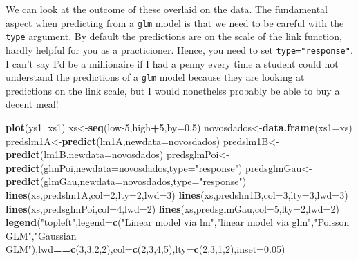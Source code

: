 \documentclass[
]{book}
\newenvironment{Shaded}{\begin{snugshade}}{\end{snugshade}}
\newcommand{\DataTypeTok}[1]{\textcolor[rgb]{0.13,0.29,0.53}{#1}}
\newcommand{\DecValTok}[1]{\textcolor[rgb]{0.00,0.00,0.81}{#1}}
\newcommand{\FloatTok}[1]{\textcolor[rgb]{0.00,0.00,0.81}{#1}}
\newcommand{\KeywordTok}[1]{\textcolor[rgb]{0.13,0.29,0.53}{\textbf{#1}}}
\newcommand{\NormalTok}[1]{#1}
\newcommand{\OperatorTok}[1]{\textcolor[rgb]{0.81,0.36,0.00}{\textbf{#1}}}
\newcommand{\StringTok}[1]{\textcolor[rgb]{0.31,0.60,0.02}{#1}}
\begin{document}
We can look at the outcome of these overlaid on the data. The fundamental aspect when predicting from a \texttt{glm} model is that we need to be careful with the \texttt{type} argument. By default the predictions are on the scale of the link function, hardly helpful for you as a practicioner. Hence, you need to set \texttt{type="response"}. I can't say I'd be a millionaire if I had a penny every time a student could not understand the predictions of a \texttt{glm} model because they are looking at predictions on the link scale, but I would nonethelss probably be able to buy a decent meal!

\begin{Shaded}
\begin{Highlighting}[]
\KeywordTok{plot}\NormalTok{(ys1}\OperatorTok{~}\NormalTok{xs1)}
\NormalTok{xs<-}\KeywordTok{seq}\NormalTok{(low}\DecValTok{-5}\NormalTok{,high}\OperatorTok{+}\DecValTok{5}\NormalTok{,}\DataTypeTok{by=}\FloatTok{0.5}\NormalTok{)}
\NormalTok{novosdados<-}\KeywordTok{data.frame}\NormalTok{(}\DataTypeTok{xs1=}\NormalTok{xs)}
\NormalTok{predslm1A<-}\KeywordTok{predict}\NormalTok{(lm1A,}\DataTypeTok{newdata=}\NormalTok{novosdados)}
\NormalTok{predslm1B<-}\KeywordTok{predict}\NormalTok{(lm1B,}\DataTypeTok{newdata=}\NormalTok{novosdados)}
\NormalTok{predsglmPoi<-}\KeywordTok{predict}\NormalTok{(glmPoi,}\DataTypeTok{newdata=}\NormalTok{novosdados,}\DataTypeTok{type=}\StringTok{"response"}\NormalTok{)}
\NormalTok{predsglmGau<-}\KeywordTok{predict}\NormalTok{(glmGau,}\DataTypeTok{newdata=}\NormalTok{novosdados,}\DataTypeTok{type=}\StringTok{"response"}\NormalTok{)}
\KeywordTok{lines}\NormalTok{(xs,predslm1A,}\DataTypeTok{col=}\DecValTok{2}\NormalTok{,}\DataTypeTok{lty=}\DecValTok{2}\NormalTok{,}\DataTypeTok{lwd=}\DecValTok{3}\NormalTok{)}
\KeywordTok{lines}\NormalTok{(xs,predslm1B,}\DataTypeTok{col=}\DecValTok{3}\NormalTok{,}\DataTypeTok{lty=}\DecValTok{3}\NormalTok{,}\DataTypeTok{lwd=}\DecValTok{3}\NormalTok{)}
\KeywordTok{lines}\NormalTok{(xs,predsglmPoi,}\DataTypeTok{col=}\DecValTok{4}\NormalTok{,}\DataTypeTok{lwd=}\DecValTok{2}\NormalTok{)}
\KeywordTok{lines}\NormalTok{(xs,predsglmGau,}\DataTypeTok{col=}\DecValTok{5}\NormalTok{,}\DataTypeTok{lty=}\DecValTok{2}\NormalTok{,}\DataTypeTok{lwd=}\DecValTok{2}\NormalTok{)}
\KeywordTok{legend}\NormalTok{(}\StringTok{"topleft"}\NormalTok{,}\DataTypeTok{legend=}\KeywordTok{c}\NormalTok{(}\StringTok{"Linear model via lm"}\NormalTok{,}\StringTok{"linear model via glm"}\NormalTok{,}\StringTok{"Poisson GLM"}\NormalTok{,}\StringTok{"Gaussian GLM"}\NormalTok{),lwd}\OperatorTok{==}\KeywordTok{c}\NormalTok{(}\DecValTok{3}\NormalTok{,}\DecValTok{3}\NormalTok{,}\DecValTok{2}\NormalTok{,}\DecValTok{2}\NormalTok{),}\DataTypeTok{col=}\KeywordTok{c}\NormalTok{(}\DecValTok{2}\NormalTok{,}\DecValTok{3}\NormalTok{,}\DecValTok{4}\NormalTok{,}\DecValTok{5}\NormalTok{),}\DataTypeTok{lty=}\KeywordTok{c}\NormalTok{(}\DecValTok{2}\NormalTok{,}\DecValTok{3}\NormalTok{,}\DecValTok{1}\NormalTok{,}\DecValTok{2}\NormalTok{),}\DataTypeTok{inset=}\FloatTok{0.05}\NormalTok{)}
\end{Highlighting}
\end{Shaded}
\end{document}
